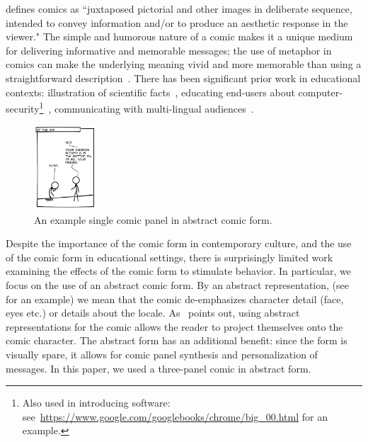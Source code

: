 \textcite{scott1993understanding} defines comics as ``juxtaposed pictorial and other images in deliberate sequence, intended to convey information and/or to produce an aesthetic response in the viewer."  The simple and humorous nature of a comic makes it a unique medium for delivering informative and memorable messages; the use of metaphor in comics can make the underlying meaning vivid and more memorable than using a straightforward description~\parencite{McDermottPB18,scott1993understanding}. There has been significant prior work in educational contexts: illustration of scientific facts~\parencite{McDermottPB18}, educating end-users about computer-security\footnote{Also used in introducing software: see~\url{https://www.google.com/googlebooks/chrome/big_00.html} for an example.}~\parencite{Zhang-Kennedy:2017:SCI:3206217.3206282}, communicating with multi-lingual audiences~\parencite{cary2004going, miguel2005ethnic}. 

\begin{figure}
    \centering
    \includegraphics[width=0.21\textwidth]{figures/intro_new.png}
  \vspace{-10pt}
  \caption{An example single comic panel in abstract comic form.} \label{fig:intro}
  \vspace{-10pt}
\end{figure}

Despite the importance of the comic form in contemporary culture, and the use of the comic form in educational settings, there is surprisingly limited work examining the effects of the comic form to stimulate behavior. In particular, we focus on the use of an abstract comic form. By an abstract representation, (see~ for an example) we mean that the comic de-emphasizes character detail (face, eyes etc.) or details about the locale. As~\textcite{scott1993understanding} points out, using abstract representations for the comic allows the reader to project themselves onto the comic character. The abstract form has an additional benefit: since the form is visually spare, it allows for comic panel synthesis and personalization of messages. In this paper, we used a three-panel comic in abstract form.

